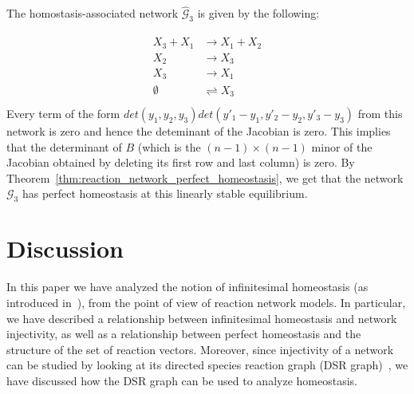 \documentclass[11pt]{article}
\theoremstyle{plain}
\theoremstyle{definition}
\theoremstyle{remark}
\newcommand\GG{\mathcal{G}}
\begin{document}
\noindent The homostasis-associated network $\hat{\GG}_3$ is given by the following:

\begin{eqnarray}
\begin{split}
X_3 + X_1  &\rightarrow X_1 + X_2 \\
X_2       &\rightarrow X_3 \\
X_3       &\rightarrow X_1 \\
\emptyset &\rightleftharpoons X_3 \\
\end{split}
\end{eqnarray}
%
Every term of the form $det(y_1,y_2,y_3)det(y'_1-y_1,y'_2-y_2,y'_3-y_3)$ from this network is zero and hence the deteminant of the Jacobian is zero. This implies that the determinant of $B$ (which is the $(n-1)\times (n-1)$ minor of the Jacobian obtained by deleting its first row and last column) is zero. By Theorem~\ref{thm:reaction_network_perfect_homeostasis}, we get that the network $\GG_3$ has perfect homeostasis at this linearly stable equilibrium.



\section{Discussion}



In this paper we have analyzed the notion of infinitesimal homeostasis (as introduced in~\cite{golubitsky2017homeostasis}), from the point of view of reaction network models. In particular, we have described a  relationship between infinitesimal homeostasis and network injectivity, as well as a relationship between perfect homeostasis and the structure of the set of reaction vectors. Moreover, since injectivity of a network can be studied by looking at its directed species reaction graph (DSR graph)~\cite{banaji2009graph}, we have discussed how the  DSR graph can be used to analyze homeostasis. 
\end{document}
